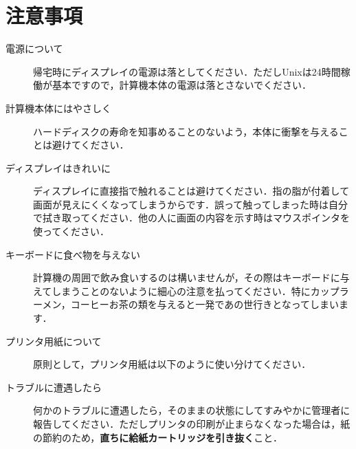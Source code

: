 \documentclass[main]{subfiles}
\begin{document}
\chapter{注意事項}

\begin{description}
    
    \item[電源について] 帰宅時にディスプレイの電源は落としてください．ただしUnixは24時間稼働が基本ですので，計算機本体の電源は落とさないでください．
     
    \item[計算機本体にはやさしく] ハードディスクの寿命を知事めることのないよう，本体に衝撃を与えることは避けてください．

    \item[ディスプレイはきれいに] ディスプレイに直接指で触れることは避けてください．指の脂が付着して画面が見えにくくなってしまうからです．誤って触ってしまった時は自分で拭き取ってください．他の人に画面の内容を示す時はマウスポインタを使ってください．

    \item[キーボードに食べ物を与えない] 計算機の周囲で飲み食いするのは構いませんが，その際はキーボードに与えてしまうことのないように細心の注意を払ってください．特にカップラーメン，コーヒーお茶の類を与えると一発であの世行きとなってしまいます．

    \item[プリンタ用紙について] 原則として，プリンタ用紙は以下のように使い分けてください．

    \vspace{0.8zw}


    \item[トラブルに遭遇したら] 何かのトラブルに遭遇したら，そのままの状態にしてすみやかに管理者に報告してください．ただしプリンタの印刷が止まらなくなった場合は，紙の節約のため，\textbf{直ちに給紙カートリッジを引き抜く}こと．

\end{description}
\end{document}
